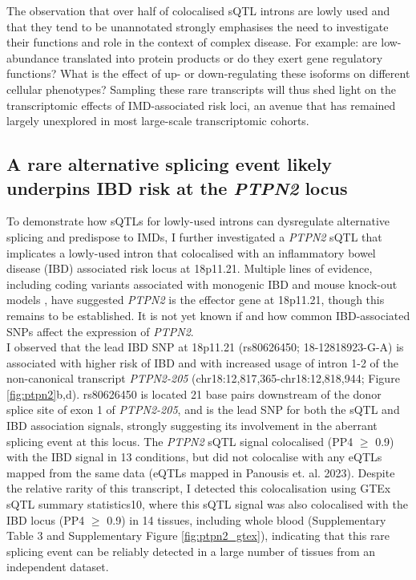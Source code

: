 The observation that over half of colocalised sQTL introns are lowly used and that they tend to be unannotated strongly emphasises the need to investigate their functions and role in the context of complex disease. For example: are low-abundance translated into protein products or do they exert gene regulatory functions? What is the effect of up- or down-regulating these isoforms on different cellular phenotypes? Sampling these rare transcripts will thus shed light on the transcriptomic effects of IMD-associated risk loci, an avenue that has remained largely unexplored in most large-scale transcriptomic cohorts. \\

\subsection{A rare alternative splicing event likely underpins IBD risk at the \textit{PTPN2} locus}
To demonstrate how sQTLs for lowly-used introns can dysregulate alternative splicing and predispose to IMDs, I further investigated a \textit{PTPN2} sQTL that implicates a lowly-used intron that colocalised with an inflammatory bowel disease (IBD) associated risk locus at 18p11.21. Multiple lines of evidence, including coding variants associated with monogenic IBD \cite{Parlato2020-lh,Pike2018-wn} and mouse knock-out models \cite{Spalinger2018-mb,Spalinger2022-xj}, have suggested \textit{PTPN2} is the effector gene at 18p11.21, though this remains to be established. It is not yet known if and how common IBD-associated SNPs affect the expression of \textit{PTPN2}. \\

I observed that the lead IBD SNP at 18p11.21 (rs80626450; 18-12818923-G-A) is associated with higher risk of IBD and with increased usage of intron 1-2 of the non-canonical transcript \textit{PTPN2-205} (chr18:12,817,365-chr18:12,818,944; Figure \ref{fig:ptpn2}b,d). rs80626450 is located 21 base pairs downstream of the donor splice site of exon 1 of \textit{PTPN2-205}, and is the lead SNP for both the sQTL and IBD association signals, strongly suggesting its involvement in the aberrant splicing event at this locus. The \textit{PTPN2} sQTL signal colocalised (PP4 $\geq$ 0.9) with the IBD signal in 13 conditions, but did not colocalise with any eQTLs mapped from the same data (eQTLs mapped in Panousis et. al. 2023). Despite the relative rarity of this transcript, I detected this colocalisation using GTEx sQTL summary statistics10, where this sQTL signal was also colocalised with the IBD locus (PP4 $\geq$ 0.9) in 14 tissues, including whole blood (Supplementary Table 3 and Supplementary Figure \ref{fig:ptpn2_gtex}), indicating that this rare splicing event can be reliably detected in a large number of tissues from an independent dataset. \\ 

